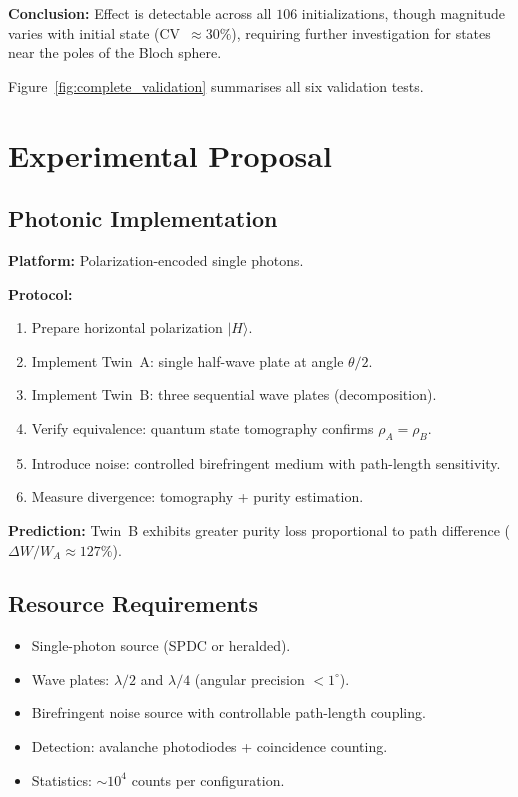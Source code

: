 \documentclass[12pt,a4paper]{article}
\begin{document}
\textbf{Conclusion:} Effect is detectable across all $106$ initializations,
though magnitude varies with initial state (CV~$\approx 30\%$), requiring
further investigation for states near the poles of the Bloch sphere.

Figure~\ref{fig:complete_validation} summarises all six validation tests.

\section{Experimental Proposal}

\subsection{Photonic Implementation}

\textbf{Platform:} Polarization-encoded single photons.

\textbf{Protocol:}
\begin{enumerate}
  \item Prepare horizontal polarization $|H\rangle$.
  \item Implement Twin~A: single half-wave plate at angle $\theta/2$.
  \item Implement Twin~B: three sequential wave plates (decomposition).
  \item Verify equivalence: quantum state tomography confirms
    $\rho_A = \rho_B$.
  \item Introduce noise: controlled birefringent medium with path-length
    sensitivity.
  \item Measure divergence: tomography + purity estimation.
\end{enumerate}

\textbf{Prediction:} Twin~B exhibits greater purity loss proportional to
path difference ($\Delta W/W_A \approx 127\%$).

\subsection{Resource Requirements}

\begin{itemize}
  \item Single-photon source (SPDC or heralded).
  \item Wave plates: $\lambda/2$ and $\lambda/4$ (angular precision
    $< 1^\circ$).
  \item Birefringent noise source with controllable path-length coupling.
  \item Detection: avalanche photodiodes + coincidence counting.
  \item Statistics: $\sim 10^4$ counts per configuration.
\end{itemize}
\end{document}

